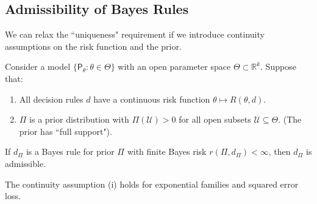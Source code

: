 \subsection{Admissibility of Bayes Rules}
\label{subsec:bayes_admissibility}

We can relax the ``uniqueness" requirement if we introduce continuity assumptions on the risk function and the prior.

\begin{theo}
\label{thm:bayes_admissibility_continuous}
Consider a model \(\{\mathsf{P}_{\theta} : \theta \in \Theta\}\) with an open parameter space \(\Theta \subset \mathbb{R}^k\). Suppose that:
\begin{enumerate}
    \item[(i)] All decision rules \(d\) have a continuous risk function \(\theta \mapsto R(\theta, d)\).
    \item[(ii)] \(\Pi\) is a prior distribution with \(\Pi(\mathcal{U}) > 0\) for all open subsets \(\mathcal{U} \subseteq \Theta\). (The prior has ``full support").
\end{enumerate}
If \(d_{\Pi}\) is a Bayes rule for prior \(\Pi\) with finite Bayes risk \(r(\Pi, d_{\Pi}) < \infty\), then \(d_{\Pi}\) is admissible.
\end{theo}

\begin{note}
The continuity assumption (i) holds for exponential families and squared error loss.
\end{note}

